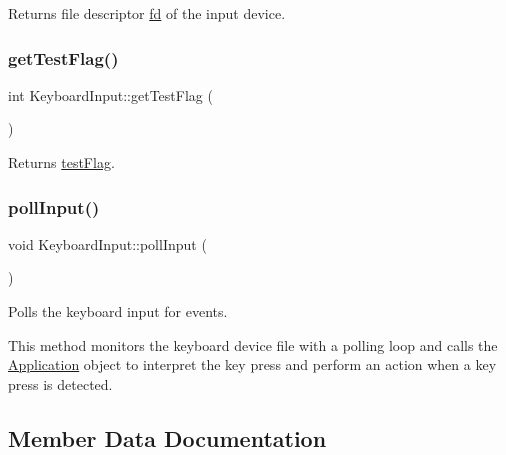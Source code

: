 \begin{DoxyReturn}{Returns}
file descriptor \hyperlink{classdrumpi_1_1KeyboardInput_a098990e43175ae8a2ad64e6d3b487c83}{fd} of the input device. 
\end{DoxyReturn}
\mbox{\label{classdrumpi_1_1KeyboardInput_a657e489023c7fe835a53d7b24c1eec39}} 
\subsubsection{\texorpdfstring{get\+Test\+Flag()}{getTestFlag()}}
{\footnotesize\ttfamily int Keyboard\+Input\+::get\+Test\+Flag (\begin{DoxyParamCaption}{ }\end{DoxyParamCaption})}

\begin{DoxyReturn}{Returns}
\hyperlink{classdrumpi_1_1KeyboardInput_a1817959cdce29597ad61ba635674bc6f}{test\+Flag}. 
\end{DoxyReturn}
\mbox{\label{classdrumpi_1_1KeyboardInput_ac74a81a24054aa5e927e03b4ba7f8c9f}} 
\subsubsection{\texorpdfstring{poll\+Input()}{pollInput()}}
{\footnotesize\ttfamily void Keyboard\+Input\+::poll\+Input (\begin{DoxyParamCaption}{ }\end{DoxyParamCaption})}



Polls the keyboard input for events. 

This method monitors the keyboard device file with a polling loop and calls the \hyperlink{classdrumpi_1_1Application}{Application} object to interpret the key press and perform an action when a key press is detected. 

\subsection{Member Data Documentation}
\mbox{\label{classdrumpi_1_1KeyboardInput_a7af8c85eed4c1997ae9b56ac5bf2a7e1}} 
